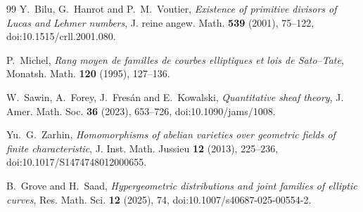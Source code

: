 \documentclass[11pt]{article}
\begin{document}
\begin{thebibliography}{99}
Y.~Bilu, G.~Hanrot and P.~M.~Voutier,
\emph{Existence of primitive divisors of Lucas and Lehmer numbers},
J. reine angew. Math. \textbf{539} (2001), 75--122,
doi:10.1515/crll.2001.080.

P.~Michel,
\emph{Rang moyen de familles de courbes elliptiques et lois de Sato--Tate},
Monatsh. Math. \textbf{120} (1995), 127--136.

W.~Sawin, A.~Forey, J.~Fres\'an and E.~Kowalski,
\emph{Quantitative sheaf theory},
J. Amer. Math. Soc. \textbf{36} (2023), 653--726,
doi:10.1090/jams/1008.

Yu.~G.~Zarhin,
\emph{Homomorphisms of abelian varieties over geometric fields of finite characteristic},
J. Inst. Math. Jussieu \textbf{12} (2013), 225--236,
doi:10.1017/S1474748012000655.

B.~Grove and H.~Saad,
\emph{Hypergeometric distributions and joint families of elliptic curves},
Res. Math. Sci. \textbf{12} (2025), 74,
doi:10.1007/s40687-025-00554-2.

\end{thebibliography}
\end{document}
